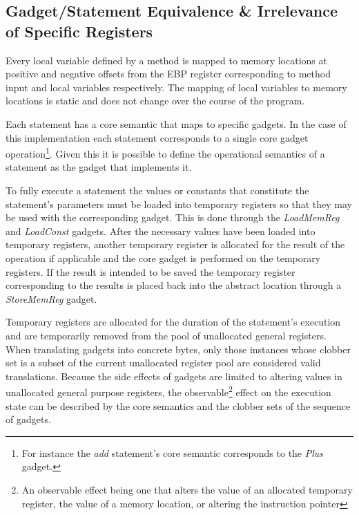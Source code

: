     \subsection{Gadget/Statement Equivalence \& Irrelevance of Specific Registers}

        Every local variable defined by a method is mapped to memory
        locations at positive and negative offsets from the EBP register
        corresponding to method input and local variables respectively. The
        mapping of local variables to memory locations is static and does
        not change over the course of the program.

        Each statement has a core semantic that maps to specific gadgets. In
        the case of this implementation each statement corresponds to a
        single core gadget operation\footnote{For instance the \emph{add}
        statement's core semantic corresponds to the \emph{Plus} gadget.}.
        Given this it is possible to define the operational semantics of a
        statement as the gadget that implements it.

        To fully execute a statement the values or constants that constitute the
        statement's parameters must be loaded into temporary registers so that
        they may be used with the corresponding gadget.  This is done through
        the \emph{LoadMemReg} and \emph{LoadConst} gadgets.  After the necessary
        values have been loaded into temporary registers, another temporary
        register is allocated for the result of the operation if applicable and
        the core gadget is performed on the temporary registers.  If the result
        is intended to be saved the temporary register corresponding to the
        results is placed back into the abstract location through a
        \emph{StoreMemReg} gadget.
        
        Temporary registers are allocated for the duration of the statement's
        execution and are temporarily removed from the pool of unallocated
        general registers. When translating gadgets into concrete bytes, only
        those instances whose clobber set is a subset of the current unallocated
        register pool are considered valid translations. Because the side
        effects of gadgets are limited to altering values in unallocated general
        purpose registers, the observable\footnote{An observable effect being
        one that alters the value of an allocated temporary register, the value
        of a memory location, or altering the instruction pointer} effect on the
        execution state can be described by the core semantics and the clobber
        sets of the sequence of gadgets.
    
